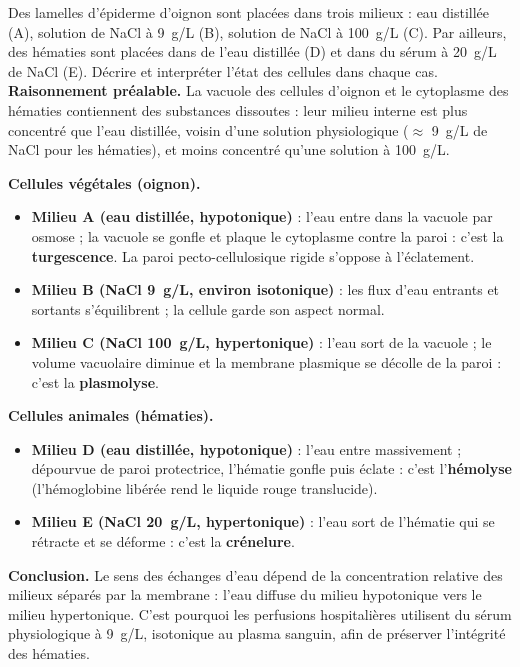 \documentclass[11pt]{article}
\begin{document}
\begin{exoresolu}
Des lamelles d'épiderme d'oignon sont placées dans trois milieux : eau distillée (A), solution de NaCl à \SI{9}{g/L} (B), solution de NaCl à \SI{100}{g/L} (C). Par ailleurs, des hématies sont placées dans de l'eau distillée (D) et dans du sérum à \SI{20}{g/L} de NaCl (E). Décrire et interpréter l'état des cellules dans chaque cas.
\tcblower
\textbf{Raisonnement préalable.} La vacuole des cellules d'oignon et le cytoplasme des hématies contiennent des substances dissoutes : leur milieu interne est plus concentré que l'eau distillée, voisin d'une solution physiologique ($\approx$ \SI{9}{g/L} de NaCl pour les hématies), et moins concentré qu'une solution à \SI{100}{g/L}.

\textbf{Cellules végétales (oignon).}
\begin{itemize}
\item \textbf{Milieu A (eau distillée, hypotonique)} : l'eau entre dans la vacuole par osmose ; la vacuole se gonfle et plaque le cytoplasme contre la paroi : c'est la \textbf{turgescence}. La paroi pecto-cellulosique rigide s'oppose à l'éclatement.
\item \textbf{Milieu B (NaCl \SI{9}{g/L}, environ isotonique)} : les flux d'eau entrants et sortants s'équilibrent ; la cellule garde son aspect normal.
\item \textbf{Milieu C (NaCl \SI{100}{g/L}, hypertonique)} : l'eau sort de la vacuole ; le volume vacuolaire diminue et la membrane plasmique se décolle de la paroi : c'est la \textbf{plasmolyse}.
\end{itemize}

\textbf{Cellules animales (hématies).}
\begin{itemize}
\item \textbf{Milieu D (eau distillée, hypotonique)} : l'eau entre massivement ; dépourvue de paroi protectrice, l'hématie gonfle puis éclate : c'est l'\textbf{hémolyse} (l'hémoglobine libérée rend le liquide rouge translucide).
\item \textbf{Milieu E (NaCl \SI{20}{g/L}, hypertonique)} : l'eau sort de l'hématie qui se rétracte et se déforme : c'est la \textbf{crénelure}.
\end{itemize}

\textbf{Conclusion.} Le sens des échanges d'eau dépend de la concentration relative des milieux séparés par la membrane : l'eau diffuse du milieu hypotonique vers le milieu hypertonique. C'est pourquoi les perfusions hospitalières utilisent du sérum physiologique à \SI{9}{g/L}, isotonique au plasma sanguin, afin de préserver l'intégrité des hématies.
\end{exoresolu}
\end{document}
